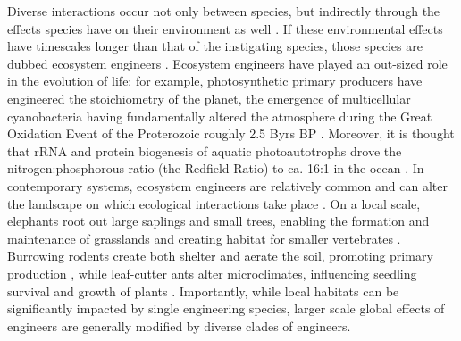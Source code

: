 \documentclass[9pt,twocolumn,twoside]{pnas-new}
\begin{document}
Diverse interactions occur not only between species, but indirectly through the effects species have on their environment as well \cite{Jones1994,Olff2009,OdlingSmee2013}.
If these environmental effects have timescales longer than that of the instigating species, those species are dubbed ecosystem engineers \cite{Hastings2007}.
Ecosystem engineers have played an out-sized role in the evolution of life: for example, photosynthetic primary producers have engineered the stoichiometry of the planet, the emergence of multicellular cyanobacteria having fundamentally altered the atmosphere during the Great Oxidation Event of the Proterozoic roughly 2.5 Byrs BP \cite{Schirrmeister2013}.
Moreover, it is thought that rRNA and protein biogenesis of aquatic photoautotrophs drove the nitrogen:phosphorous ratio (the Redfield Ratio) to ca. 16:1 in the ocean \cite{Loladze2011}.
In contemporary systems, ecosystem engineers are relatively common and can alter the landscape on which ecological interactions take place \cite{Wright2006}.
On a local scale, elephants root out large saplings and small trees, enabling the formation and maintenance of grasslands \cite{Haynes2012} and creating habitat for smaller vertebrates \cite{Pringle2008}.
Burrowing rodents create both shelter and aerate the soil, promoting primary production \cite{Reichman2002}, while leaf-cutter ants alter microclimates, influencing seedling survival and growth of plants \cite{Meyer2011}.
Importantly, while local habitats can be significantly impacted by single engineering species, larger scale global effects of engineers are generally modified by diverse clades of engineers.

\end{document}

